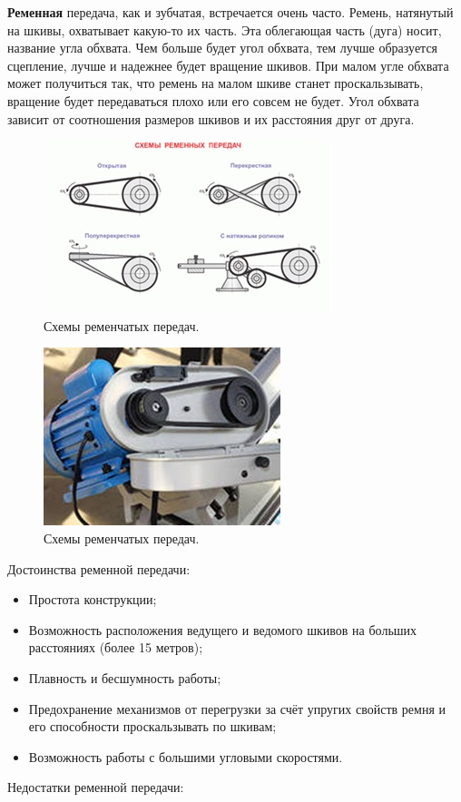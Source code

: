{\bfseries Ременная} передача, как и зубчатая, встречается очень часто. Ремень, натянутый на шкивы, охватывает какую-то их часть. Эта облегающая часть (дуга) носит, название угла обхвата. Чем больше будет угол обхвата, тем лучше образуется сцепление, лучше и надежнее будет вращение шкивов. При малом угле обхвата может получиться так, что ремень на малом шкиве станет проскальзывать, вращение будет передаваться плохо или его совсем не будет. Угол обхвата зависит от соотношения размеров шкивов и их расстояния друг от друга.

\begin{figure}[h!]
	\begin{center}
		\includegraphics[width=0.55\linewidth]{chapters/chapter5/images/7}
		\caption{Схемы ременчатых передач.}
		\label{ris:image5x6}
	\end{center}
\end{figure}
\begin{figure}[h!]
	\begin{center}
		\includegraphics[width=0.55\linewidth]{chapters/chapter5/images/8}
		\caption{Схемы ременчатых передач.}
		\label{ris:image5x7}
	\end{center}
\end{figure}
\clearpage
\noindent Достоинства ременной передачи:	

\begin{itemize}
	\item Простота конструкции;
	\item Возможность расположения ведущего и ведомого шкивов на больших расстояниях (более 15 метров);
	\item Плавность и бесшумность работы;
	\item Предохранение механизмов от перегрузки за счёт упругих свойств ремня и его способности проскальзывать по шкивам;
	\item Возможность работы с большими угловыми скоростями.\\
\end{itemize}
\noindent Недостатки ременной передачи:

